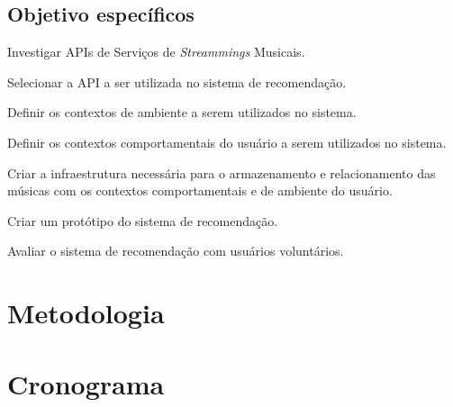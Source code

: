 \documentclass{article}
\begin{document}
\subsection{Objetivo específicos}

\begin{itemize}
\item Investigar APIs de Serviços de \textit{Streammings} Musicais.

\item Selecionar a API a ser utilizada no sistema de recomendação.

{\color{red} \item Definir os contextos de ambiente a serem utilizados no sistema.

\item Definir os contextos comportamentais do usuário a serem utilizados no sistema.}

\item Criar a infraestrutura necessária para o armazenamento e relacionamento das músicas com os contextos comportamentais e de ambiente do usuário.

{\color{red} \item Criar um protótipo do sistema de recomendação.}

\item Avaliar o sistema de recomendação com usuários voluntários.

\end{itemize}

\newpage

\section{Metodologia}

\newpage

\section{Cronograma}

\newpage


% 

\end{document}
